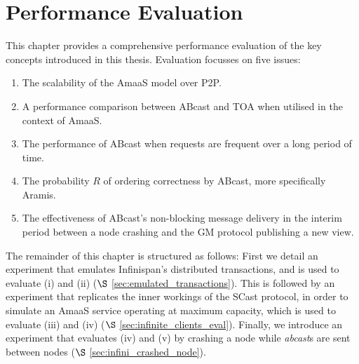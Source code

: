 \chapter{Performance Evaluation}\label{ch:perf_eval}
    \graphicspath{{Chapter6-PerformanceEvaluation/Figs/Vector/}{Chapter6-PerformanceEvaluation/Figs/}}
    
    This chapter provides a comprehensive performance evaluation of the key concepts introduced in this thesis.  Evaluation focusses on five issues: 
    \begin{enumerate}[label=\roman*]
    \item    The scalability of the \textsf{AmaaS} model over P2P.  
    
    \item    A performance comparison between \textsf{ABcast} and TOA when utilised in the context of \textsf{AmaaS}.
    
    \item    The performance of \textsf{ABcast} when requests are frequent over a long period of time.  
    
    \item    The probability $R$ of ordering correctness by \textsf{ABcast}, more specifically \textsf{Aramis}.
    
    \item    The effectiveness of \textsf{ABcast}'s non-blocking message delivery in the interim period between a node crashing and the GM protocol publishing a new view.  
    \end{enumerate}    

   
    The remainder of this chapter is structured as follows: First we detail an experiment that emulates Infinispan's distributed transactions, and is used to evaluate (i) and (ii) ($\S$ \ref{sec:emulated_transactions}).  This is followed by an experiment that replicates the inner workings of the \textsf{SCast} protocol, in order to simulate an \textsf{AmaaS} service operating at maximum capacity, which is used to evaluate (iii) and (iv) ($\S$ \ref{sec:infinite_clients_eval}).  Finally, we introduce an experiment that evaluates (iv) and (v) by crashing a node while \emph{abcast}s are sent between nodes ($\S$ \ref{sec:infini_crashed_node}).  


